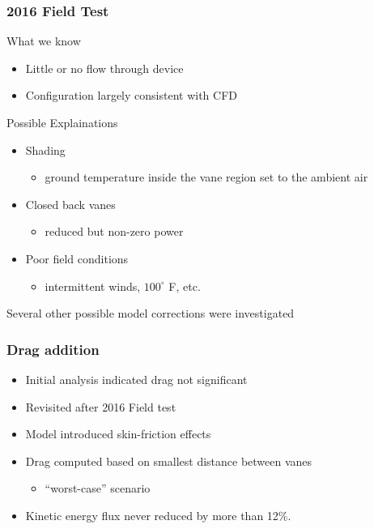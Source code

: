 \documentclass[mathserif]{beamer}
\begin{document}
%
%
%
\begin{frame}
 \frametitle{2016 Field Test}

\begin{block}{What we know}
\begin{itemize}
 \item Little or no flow through device
 \item Configuration largely consistent with CFD
\end{itemize}
\end{block}

\begin{block}{Possible Explainations}
\begin{itemize}
 \item Shading
       \begin{itemize}
	\item ground temperature inside the vane region set to the ambient air 
       \end{itemize}
 \item Closed back vanes
       \begin{itemize}
	\item reduced but non-zero power
       \end{itemize}
 \item Poor field conditions
       \begin{itemize}
	\item intermittent winds, $100^{\circ}$ F, etc. 
       \end{itemize}
\end{itemize}
\end{block}

\bigbreak
\centering 
Several other possible model corrections were investigated

\end{frame}

%
%
%
\begin{frame}
 \frametitle{Drag addition}
\begin{itemize}
 \item Initial analysis indicated drag not significant
 \item Revisited after 2016 Field test
 \item Model introduced skin-friction effects
 \item Drag computed based on smallest distance between vanes
       \begin{itemize}
	\item ``worst-case'' scenario
       \end{itemize}
 \item Kinetic energy flux never reduced by more than 12\%.
\end{itemize}


\end{frame}
\end{document}
